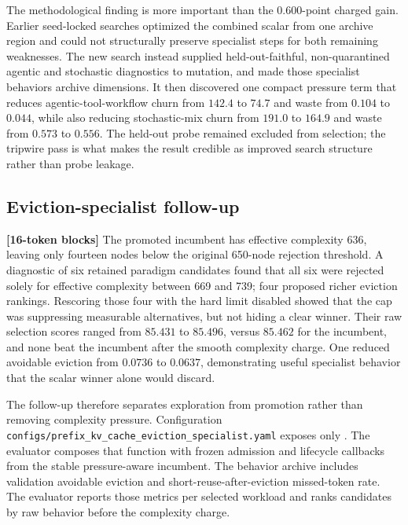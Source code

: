 \documentclass[11pt]{article}
\newcommand{\code}[1]{\texttt{\detokenize{#1}}}
\newcommand{\filepath}[1]{\nolinkurl{#1}}
\newcommand{\blocktag}[1]{\textbf{\color{navy}[#1-token blocks]}}
\begin{document}
The methodological finding is more important than the \(0.600\)-point charged gain.
Earlier seed-locked searches optimized the combined scalar from one archive region and
could not structurally preserve specialist steps for both remaining weaknesses.  The
new search instead supplied held-out-faithful, non-quarantined agentic and stochastic
diagnostics to mutation, and made those specialist behaviors archive dimensions.  It
then discovered one compact pressure term that reduces agentic-tool-workflow churn
from \(142.4\) to \(74.7\) and waste from \(0.104\) to \(0.044\), while also reducing
stochastic-mix churn from \(191.0\) to \(164.9\) and waste from \(0.573\) to \(0.556\).
The held-out probe remained excluded from selection; the tripwire pass is what makes
the result credible as improved search structure rather than probe leakage.

\subsection{Eviction-specialist follow-up}
\label{sec:eviction-specialist}

\blocktag{16} The promoted incumbent has effective complexity 636, leaving only
fourteen nodes below the original 650-node rejection threshold.  A diagnostic of six retained paradigm
candidates found that all six were rejected solely for effective complexity between
669 and 739; four proposed richer eviction rankings.  Rescoring those four with the
hard limit disabled showed that the cap was suppressing measurable alternatives, but
not hiding a clear winner.  Their raw selection scores ranged from \(85.431\) to
\(85.496\), versus \(85.462\) for the incumbent, and none beat the incumbent after the
smooth complexity charge.  One reduced avoidable eviction from \(0.0736\) to
\(0.0637\), demonstrating useful specialist behavior that the scalar winner alone
would discard.

The follow-up therefore separates exploration from promotion rather than removing
complexity pressure.  Configuration
\filepath{configs/prefix_kv_cache_eviction_specialist.yaml} exposes only
\code{score_eviction(block, now, frequency, priority)}.  The evaluator composes that
function with frozen admission and lifecycle callbacks from the stable pressure-aware
incumbent.  The behavior archive includes validation avoidable eviction and
short-reuse-after-eviction missed-token rate.  The evaluator reports those metrics per
selected workload and ranks candidates by raw behavior before the complexity charge.
\end{document}
